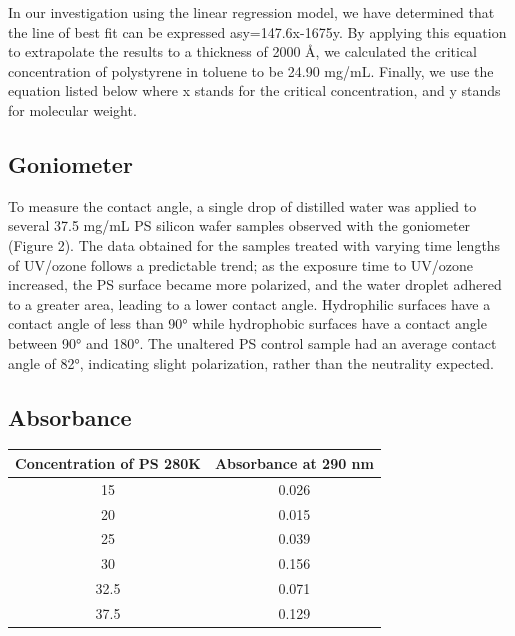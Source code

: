 \documentclass[twocolumn]{article}
\begin{document}
                In our investigation using the linear regression model, we have determined that the line of best fit can be expressed asy=147.6x-1675y. By applying this equation to extrapolate the results to a thickness of 2000 Å, we calculated the critical concentration of polystyrene in toluene to be 24.90 mg/mL. Finally, we use the equation listed below where x stands for the critical concentration, and y stands for molecular weight.

            \subsection{Goniometer}
                To measure the contact angle, a single drop of distilled water was applied to several 37.5 mg/mL PS silicon wafer samples observed with the goniometer (Figure 2). The data obtained for the samples treated with varying time lengths of UV/ozone follows a predictable trend; as the exposure time to UV/ozone increased, the PS surface became more polarized, and the water droplet adhered to a greater area, leading to a lower contact angle. Hydrophilic surfaces have a contact angle of less than 90° while hydrophobic surfaces have a contact angle between 90° and 180°. The unaltered PS control sample had an average contact angle of 82°, indicating slight polarization, rather than the neutrality expected.
            
            \subsection{Absorbance}

                \begin{table}
                    \centering
                    \begin{tabular}{@{}cc@{}}
                        \toprule
                        Concentration of PS 280K & Absorbance at 290 nm \\ \midrule
                        15                                & 0.026                \\
                        20                                & 0.015                \\
                        25                                & 0.039                \\
                        30                                & 0.156                \\
                        32.5                              & 0.071                \\
                        37.5                              & 0.129                \\ \bottomrule
                    \end{tabular}
                \end{table}
\end{document}
